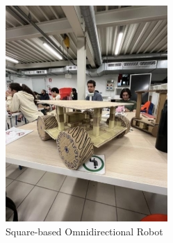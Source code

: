 \begin{figure}[H]
    \centering
    \includegraphics[width=0.5\linewidth]{../ReportMovementModule/images/Aspose.Words.728084da-df58-4b9d-a372-f65cffbdb23d.002.jpeg}
    \caption{Square-based Omnidirectional Robot}
\end{figure}

